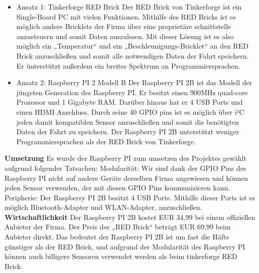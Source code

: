 \begin{itemize}
\item Ansatz 1: Tinkerforge RED Brick
Der RED Brick von Tinkerforge ist ein Single-Board PC mit vielen Funktionen.
Mithilfe des RED Bricks ist es möglich andere Bricklets der Firma über eine proprietäre schnittstelle anzusteuern und somit Daten auszulesen.
Mit dieser Lösung ist es also möglich ein „Temperatur“ und ein „Beschleunigungs-Bricklet“ an den RED Brick anzuschließen und somit alle notwendigen Daten der Fahrt speichern.
Er ünterstützt außerdem ein breites Spektrum an Programmiersprachen.
\cite{Tinkerforge}

\item Ansatz 2: Raspberry PI 2 Modell B
Der Raspberry PI 2B ist das Modell der jüngsten Generation des Raspberry PI. Er besitzt einen 900MHz quad-core Prozessor und 1 Gigabyte RAM. Darüber hinaus hat er 4 USB Ports und einen HDMI Anschluss. Durch seine 40 GPIO pins ist es möglich über i²C jeden damit kompatiblen Sensor anzuschließen und somit die benötigten Daten der Fahrt zu speichern.
Der Raspberry PI 2B unterstützt weniger Programmiersprachen als der RED Brick von Tinkerforge.
\end{itemize}

\textbf{Umsetzung\newline}
\newline
Es wurde der Raspberry PI zum umsetzen des Projektes gewählt aufgrund folgender Tatsachen:
Modularität:
Wir sind dank der GPIO Pins des Raspberry PI nicht auf andere Geräte derselben Firma angewiesen und können jeden Sensor verwenden, der mit diesen GPIO Pins kommunizieren kann.
Peripherie:
Der Raspberry PI 2B besitzt 4 USB Ports. Mithilfe dieser Ports ist es möglich Bluetooth-Adapter und WLAN-Adapter, anzuschließen.
\newpage
\textbf{Wirtschaftlichkeit\newline}
\newline
Der Raspberry PI 2B kostet EUR 34,99 bei einem offiziellen Anbieter der Firma.
\cite{redbrick}
Der Preis des „RED Brick“ beträgt EUR 69,99 beim Anbieter direkt.
\cite{redbrick}
Das bedeutet der Raspberry PI 2B ist um fast die Häfte günstiger als der RED Brick, und aufgrund der
Modularität des Raspberry PI können auch billigere Sensoren verwendet werden als beim tinkerforge
RED Brick.

